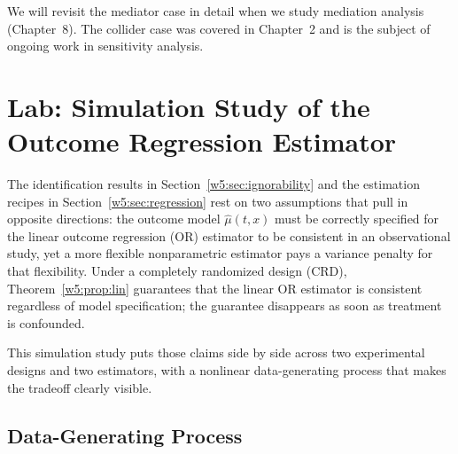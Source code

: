 \documentclass[master.tex]{subfiles}
\begin{document}
\noindent We will revisit the mediator case in detail when we study
mediation analysis (Chapter~8).  The collider case was covered in
Chapter~2 and is the subject of ongoing work in sensitivity analysis.

\section{Lab: Simulation Study of the Outcome Regression Estimator}
\label{w5:sec:lab}

The identification results in Section~\ref{w5:sec:ignorability} and the
estimation recipes in Section~\ref{w5:sec:regression} rest on two
assumptions that pull in opposite directions: the outcome model
$\hat\mu(t,x)$ must be correctly specified for the linear outcome
regression (OR) estimator to be consistent in an observational study,
yet a more flexible nonparametric estimator pays a variance penalty for
that flexibility.  Under a completely randomized design (CRD),
Theorem~\ref{w5:prop:lin} guarantees that the linear OR estimator is
consistent regardless of model specification; the guarantee disappears
as soon as treatment is confounded.

This simulation study puts those claims side by side across two
experimental designs and two estimators, with a nonlinear
data-generating process that makes the tradeoff clearly visible.

\subsection*{Data-Generating Process}
\end{document}
